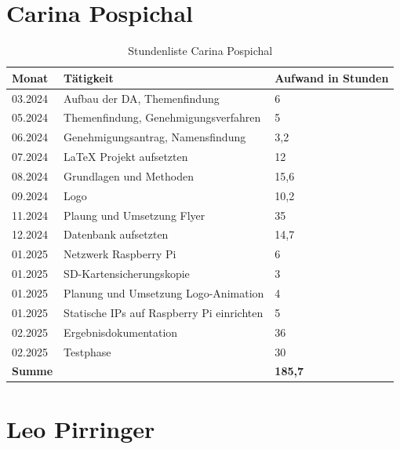 \section*{Carina Pospichal}
\begin{table}[h]
	\begin{tabular}{p{2.5cm} p{10.5cm} p{2.5cm}}
		\hline
		\textbf{Monat} & \textbf{Tätigkeit} & \textbf{Aufwand in Stunden} \\
		\hline
		03.2024 & Aufbau der DA, Themenfindung & 6 \\
		05.2024 & Themenfindung, Genehmigungsverfahren & 5 \\
		06.2024 & Genehmigungsantrag, Namensfindung & 3,2 \\
		07.2024 & LaTeX Projekt aufsetzten& 12 \\
		08.2024 & Grundlagen und Methoden & 15,6 \\
		09.2024 & Logo & 10,2 \\
		11.2024 & Plaung und Umsetzung Flyer & 35 \\
		12.2024 & Datenbank aufsetzten & 14,7 \\
		01.2025 & Netzwerk Raspberry Pi & 6 \\
		01.2025 & SD-Kartensicherungskopie & 3 \\
		01.2025 & Planung und Umsetzung Logo-Animation & 4 \\
		01.2025 & Statische IPs auf Raspberry Pi einrichten & 5 \\
		02.2025 & Ergebnisdokumentation &  36\\
		02.2025 & Testphase & 30 \\
		
		\hline
		\textbf{Summe} & & \textbf{185,7} \\
		\hline
	\end{tabular}
	\caption{Stundenliste Carina Pospichal}
	\label{tab:arbeitsaufwand_Pospichal}
\end{table}

\newpage

\section*{Leo Pirringer}

